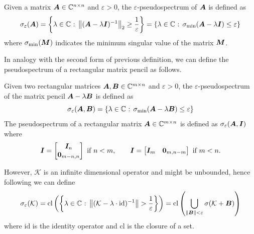 \begin{definition}
Given a matrix $\vb*{A}\in\mathbb{C}^{n\times n}$ and $\varepsilon > 0$, the $\varepsilon$-pseudospectrum of $\vb*{A}$ is defined as
\begin{equation}
    \label{pseudospectrum_matrix_def}
    \sigma_{\varepsilon}(\vb*{A}) = \left\{ \lambda\in\C \text{ : } \norm{(\vb*{A} - \lambda \vb*{I})^{-1}}_2 \geq \frac{1}{\varepsilon}\right\} = \left\{ \lambda\in\C \text{ : } \sigma_{\mathrm{min}}(\vb*{A} - \lambda \vb*{I}) \leq \varepsilon \right\} %
\end{equation}
where $\sigma_{\mathrm{min}}(\vb*{M})$ indicates the minimum singular value of the matrix $\vb*{M}$.
\end{definition}
In analogy with the second form of previous definition, we can define the pseudospectrum of a rectangular matrix pencil as follows.
\begin{definition}
Given two rectangular matrices $\vb*{A},\vb*{B} \in\mathbb{C}^{m\times n}$ and $\varepsilon > 0$, the $\varepsilon$-pseudospectrum of the matrix pencil $\vb*{A}- \lambda \vb*{B}$ is defined as
\begin{equation}
    \label{pseudospectrum_matrix_pencil_def}
    \sigma_{\varepsilon}(\vb*{A}, \vb*{B}) = \left\{ \lambda\in\C \text{ : } \sigma_{\mathrm{min}}(\vb*{A} - \lambda \vb*{B}) \leq \varepsilon \right\} %
\end{equation}
The pseudospectrum of a rectangular matrix $\vb*{A}\in\mathbb{C}^{m\times n}$ is defined as $    \sigma_{\varepsilon}(\vb*{A}, \vb*{I})$ where
\begin{equation}
    \vb*{I} = \begin{bmatrix} \vb*{I}_n \\ \vb*{0}_{m-n,n}\end{bmatrix} \text{ if $n<m$}, \qquad \vb*{I} = \begin{bmatrix} \vb*{I}_m & \vb*{0}_{m,n-m}\end{bmatrix} \text{ if $m<n$}.
\end{equation}
\end{definition}
However, $\mathcal{K}$ is an infinite dimensional operator and might be unbounded, hence following \cite{colbrook_rigorous_2021} we can define
\begin{equation}
    \label{pseudospectrum_koopman_def}
    \sigma_{\varepsilon}(\mathcal{K}) = \mathrm{cl}\left( \left\{ \lambda\in\mathbb{C} \text{ : } \norm{(\mathcal{K} - \lambda \cdot \mathrm{id})^{-1}} > \frac{1}{\varepsilon}\right\} \right) = \mathrm{cl}\left( \bigcup_{\norm{\vb*{B}} < \varepsilon} \sigma(\mathcal{K}+ \vb*{B}) \right)
\end{equation}
where $\mathrm{id}$ is the identity operator and $\mathrm{cl}$ is the closure of a set.



